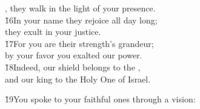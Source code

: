 \begin{poetry}
\poemll    {}, they walk in the light of your presence. \\
\poeml \v{16}In your name they rejoice all day long; \\
\poemll    they exult in your justice. \\
\poeml \v{17}For you are their strength's grandeur; \\
\poemll    by your favor you exalted our power. \\
\poeml \v{18}Indeed, our shield belongs to the , \\
\poemll    and our king to the Holy One of Israel.
\end{poetry}

\begin{poetry}
\poeml \v{19}You spoke to your faithful ones through a vision:
\end{poetry}

